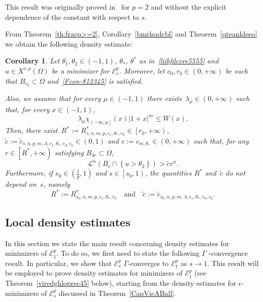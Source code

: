 \documentclass[12pt]{article}
\numberwithin{equation}{section}
\newtheorem{cor}[thm]{Corollary}
\renewcommand{\leq}{\leqslant}
\begin{document}
This result was originally proved in~\cite{MR3133422}
for $p=2$ and without the explicit dependence of the constant with respect to $s$.  

From Theorem~\ref{th:fracp>=2}, Corollary~\ref{bmrlsadcbl} and Theorem~\ref{qteanldeeo} we obtain the following density estimate: 

\begin{cor}\label{coro-09}
Let $\theta_1,\theta_2\in (-1,1)$, $\theta_*$, $\theta^*$ as in~\eqref{liibfdcvre5555} and $u\in X^{s,p}(\Omega)$ be a minimizer for $\mathcal{E}_s^p$.  Moreover,  let $c_0,r_0\in (0,+\infty)$ be such that $B_{r_0}\subset \Omega$ and~\eqref{Fcon-812345} is satisfied.   

Also, we assume that for every $\mu\in (-1,1)$ there exists~$\lambda_\mu\in (0,+\infty)$ such that, for every $x\in (-1,1)$,
\begin{equation}\label{condiWzione}
\lambda_\mu \chi_{\left(-\infty,\mu\right]}(x)\left|1+x\right|^m  \leq W(x).
\end{equation}
Then, there exist~$R^*:=R_{s,n,m,p,c_1,\theta_*,r_0}^*\in \left[r_0,+\infty\right)$, $\tilde{c}:=\tilde{c}_{s,n,p,m,\Lambda,c_1,\theta_*,r_0,c_0}\in (0,1)$ and $c:=c_{m,\theta_*}\in(0,+\infty)$ such that, for any $r\in \left[R^*,+\infty\right)$ satisfying $B_{4r}\subset \Omega$,
\begin{equation}\label{benzina}
\mathcal{L}^n(B_r\cap \left\lbrace u>\theta_2 \right\rbrace)>\tilde{c}r^n.
\end{equation}
Furthermore, if $s_0\in \left(\frac{1}{p},1\right)$ and $s\in \left[s_0,1\right)$, the quantities $R^{*}$ and~$\tilde{c}$ do not depend on~$s$, namely
\begin{equation}\label{cala}
R^{*}:= R_{s_0,n,m,p,c_1,\theta_*,r_0}^{*}\quad\mbox{and}\quad \tilde{c}:=\tilde{c}_{s_0,n,p,m,\Lambda, c_1,\theta_*,r_0,c_0}. 
\end{equation}
\end{cor}



\subsection{Local density estimates}\label{ere-optre}

In this section we state the main result concerning density estimates for minimizers of  $\mathcal{E}_1^p$. To do so, we first need to state the following $\Gamma$ -convergence result. In particular, we show that $\mathcal{E}_s^p$ $\Gamma$-converges to $\mathcal{E}_1^p$ as $s\to 1$. This result will be employed to prove density estimates for minimizers of $\mathcal{E}_1^p$ (see Theorem~\ref{viredghloprec45} below), starting from the density estimates for $\epsilon$-minimizers of $\mathcal{E}_s^p$ discussed  in Theorem~\ref{CapVieABall}. 
\end{document}
